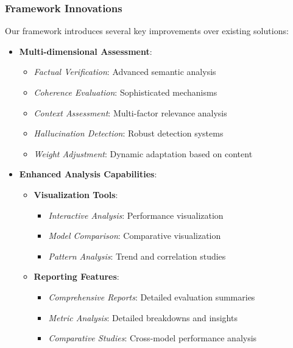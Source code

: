 \vspace{0.5em}
\subsubsection{Framework Innovations}
Our framework introduces several key improvements over existing solutions:

\begin{itemize}
    \item \textbf{Multi-dimensional Assessment}:
    \begin{itemize}
        \item \textit{Factual Verification}: Advanced semantic analysis
        \item \textit{Coherence Evaluation}: Sophisticated mechanisms
        \item \textit{Context Assessment}: Multi-factor relevance analysis
        \item \textit{Hallucination Detection}: Robust detection systems
        \item \textit{Weight Adjustment}: Dynamic adaptation based on content
    \end{itemize}
    
    \item \textbf{Enhanced Analysis Capabilities}:
    \begin{itemize}
        \item \textbf{Visualization Tools}:
        \begin{itemize}
            \item \textit{Interactive Analysis}: Performance visualization
            \item \textit{Model Comparison}: Comparative visualization
            \item \textit{Pattern Analysis}: Trend and correlation studies
        \end{itemize}
        \item \textbf{Reporting Features}:
        \begin{itemize}
            \item \textit{Comprehensive Reports}: Detailed evaluation summaries
            \item \textit{Metric Analysis}: Detailed breakdowns and insights
            \item \textit{Comparative Studies}: Cross-model performance analysis
        \end{itemize}
    \end{itemize}
    

\end{itemize}

